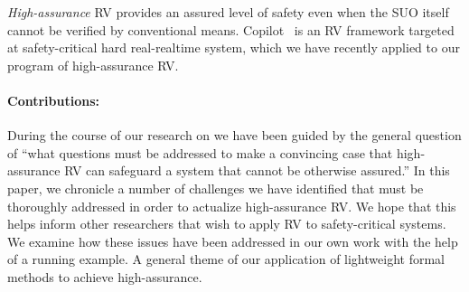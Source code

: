 \emph{High-assurance} RV provides an assured level of safety even when
the SUO itself cannot be verified  by conventional
means. Copilot~\cite{copilot, pike-isse-13} is an RV framework
targeted at safety-critical hard real-realtime system, which we have
recently applied to our program of high-assurance RV.  


\paragraph{Contributions:} During the course of our research on we
have been guided by the general question of ``what questions must be
addressed  to make a
convincing case that  high-assurance RV can safeguard a
system that cannot be otherwise assured.''  In this paper, we
chronicle a number of  challenges we have identified that must be
thoroughly addressed in order to actualize high-assurance RV.  We hope
that this helps inform other researchers that wish to apply RV to
safety-critical systems. We examine  how  these issues have been
addressed in our own work   with the help of a running example. A general theme of our
application of lightweight formal methods to achieve
high-assurance.   




